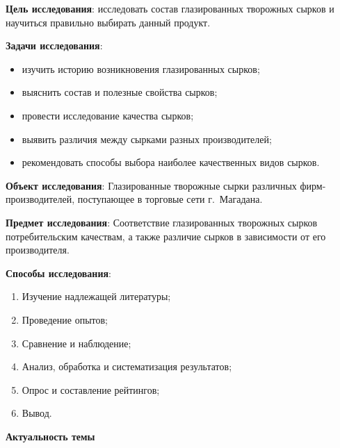\bigskip
{}



\makeProcTitleSchool


\textbf{Цель исследования}: исследовать состав глазированных творожных сырков и научиться правильно выбирать данный продукт.

\textbf{Задачи исследования}:
\begin{itemize}[noitemsep]\vspace{-8pt}
\item изучить историю возникновения глазированных сырков;
\item выяснить состав и полезные свойства сырков;
\item провести исследование качества сырков;
\item выявить различия между сырками разных производителей;
\item рекомендовать способы выбора наиболее качественных видов сырков.
\end{itemize}\vspace{-8pt}

\textbf{Объект исследования}: Глазированные творожные сырки различных фирм-произ\-во\-ди\-те\-лей, поступающее в торговые сети г.~Магадана.

\textbf{Предмет исследования}: Соответствие глазированных творожных сырков потребительским качествам, а также различие сырков в зависимости от его производителя.

\textbf{Способы исследования}:
\begin{enumerate}[noitemsep]\vspace{-8pt}
\item Изучение надлежащей литературы;
\item Проведение опытов;
\item Сравнение и наблюдение;
\item Анализ, обработка и систематизация результатов;
\item Опрос и составление рейтингов;
\item Вывод.
\end{enumerate}\vspace{-8pt}

\textbf{Актуальность темы}

